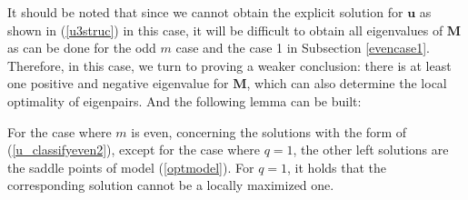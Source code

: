 It  should  be  noted  that   since  we  cannot  obtain  the  explicit  solution  for  $\mathbf u$ as shown in (\ref{u3struc}) in  this  case,  it  will be  difficult  to obtain  all  eigenvalues of $\mathbf M$  as  can be  done    for  the  odd $m$  case  and 
the  case  1  in  Subsection  \ref{evencase1}.
Therefore,  in  this  case,  
we    turn   to  proving    a  weaker   conclusion:  there  is  at  least   one  positive   and  negative  eigenvalue  for $\mathbf M$, which can also 
determine the local  optimality of eigenpairs. 
And the following lemma can be built: 
  
  \begin{lemma}\label{Theorem_structureoflocaleven2}
  	For the case where   $m$ is even,  concerning  the solutions 
  	with the form of  (\ref{u_classifyeven2}),
  except for the case where $q=1$, the other left solutions
  	are   the  saddle    points  of    model (\ref{optmodel}). 
 For $q=1$, it holds that the corresponding solution cannot be a locally maximized one.
  	
  	
  \end{lemma}




